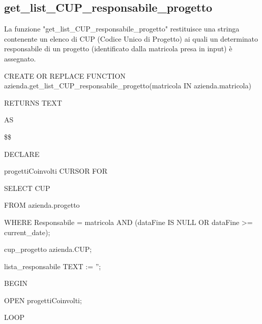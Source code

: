         \subsection{get\_list\_CUP\_responsabile\_progetto}
        La funzione "get\_list\_CUP\_responsabile\_progetto" restituisce una stringa contenente un elenco di CUP (Codice Unico di Progetto) ai quali un determinato responsabile di un progetto (identificato dalla matricola presa in input) è assegnato.
            \ttfamily
                \begin{flushleft}
                    \begin{description}
                        \item CREATE OR REPLACE FUNCTION azienda.get\_list\_CUP\_responsabile\_progetto(matricola IN azienda.matricola) 
                        \item RETURNS TEXT      
                        \item AS
                        \item \$\$
                        \item DECLARE
                        \begin{description}
                            \item progettiCoinvolti CURSOR FOR
                            \begin{description}
                                \item SELECT CUP
                                \item FROM azienda.progetto
                                \item WHERE Responsabile = matricola AND (dataFine IS NULL OR dataFine >= current\_date);
                            \end{description}
                            \item cup\_progetto azienda.CUP;
                            \item lista\_responsabile TEXT := '';
                        \end{description}
                        \item BEGIN 
                            \begin{description}
                                \item OPEN progettiCoinvolti;
                                \item LOOP
                                

\end{description}
\end{description}
\end{flushleft}
